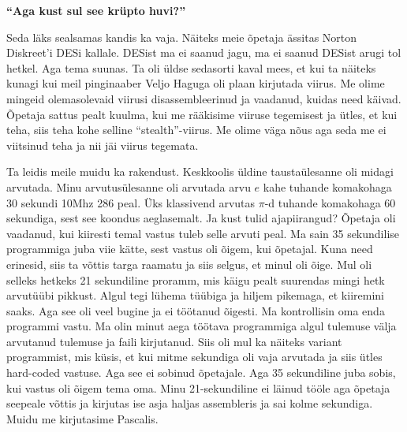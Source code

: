 \textbf{\enquote{Aga kust sul see krüpto huvi?}}

Seda läks sealsamas kandis ka vaja. Näiteks meie õpetaja ässitas Norton Diskreet'i DESi kallale. DESist ma ei saanud jagu, ma ei saanud DESist arugi tol hetkel. Aga tema suunas. Ta oli üldse sedasorti kaval mees, et kui ta näiteks kunagi kui meil pinginaaber Veljo Haguga oli plaan kirjutada viirus. Me olime mingeid olemasolevaid viirusi disassembleerinud ja vaadanud, kuidas need käivad. Õpetaja sattus pealt kuulma, kui me rääkisime viiruse tegemisest ja ütles, et kui teha, siis teha kohe selline \enquote{stealth}-viirus. Me olime väga nõus aga seda me ei viitsinud teha ja nii jäi viirus tegemata. 

Ta leidis meile muidu ka rakendust. Keskkoolis üldine taustaülesanne oli midagi arvutada. Minu arvutusülesanne oli arvutada arvu $e$ kahe tuhande komakohaga 30 sekundi 10Mhz 286 peal. Üks klassivend arvutas $\pi$-d tuhande komakohaga 60 sekundiga, sest see koondus aeglasemalt. Ja kust tulid ajapiirangud? Õpetaja oli vaadanud, kui kiiresti temal vastus tuleb selle arvuti peal. Ma sain 35 sekundilise programmiga juba viie kätte, sest vastus oli õigem, kui õpetajal. Kuna need erinesid, siis ta võttis targa raamatu ja siis selgus, et minul oli õige. Mul oli selleks hetkeks 21 sekundiline proramm, mis käigu pealt suurendas mingi hetk arvutüübi pikkust. Algul tegi lühema tüübiga ja hiljem pikemaga, et kiiremini saaks. Aga see oli veel bugine ja ei töötanud õigesti. Ma kontrollisin oma enda programmi vastu. Ma olin minut aega töötava programmiga algul tulemuse välja arvutanud tulemuse ja faili kirjutanud. Siis oli mul ka näiteks variant programmist, mis küsis, et kui mitme sekundiga oli vaja arvutada ja siis ütles hard-coded vastuse. Aga see ei sobinud õpetajale. Aga 35 sekundiline juba sobis, kui vastus oli õigem tema oma.  Minu 21-sekundiline ei läinud tööle aga õpetaja seepeale võttis ja kirjutas ise asja haljas assembleris ja sai kolme sekundiga. Muidu me kirjutasime Pascalis. 

